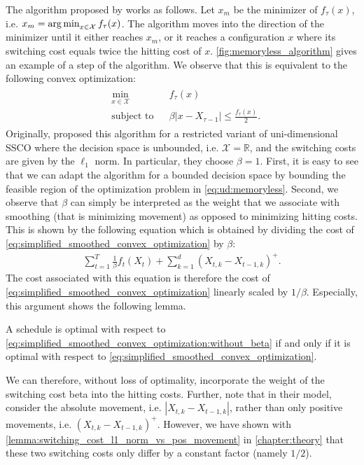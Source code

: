 The algorithm proposed by \citeauthor*{Bansal2015} works as follows. Let $x_m$ be the minimizer of $f_{\tau}(x)$, i.e. $x_m = \operatorname*{arg\,min}_{x \in \mathcal{X}} f_{\tau}(x)$. The algorithm moves into the direction of the minimizer until it either reaches $x_m$, or it reaches a configuration $x$ where its switching cost equals twice the hitting cost of $x$. \autoref{fig:memoryless_algorithm} gives an example of a step of the algorithm. We observe that this is equivalent to the following convex optimization: \begin{align}\label{eq:ud:memoryless}\begin{aligned}
    &\min_{x \in \mathcal{X}} &&f_{\tau}(x) \\
    &\text{subject to}        &&\beta |x - X_{\tau-1}| \leq \frac{f_{\tau}(x)}{2}.
\end{aligned}\end{align} Originally, \citeauthor*{Bansal2015} proposed this algorithm for a restricted variant of uni-dimensional SSCO where the decision space is unbounded, i.e. $\mathcal{X} = \mathbb{R}$, and the switching costs are given by the $\ell_1$ norm. In particular, they choose $\beta = 1$. First, it is easy to see that we can adapt the algorithm for a bounded decision space by bounding the feasible region of the optimization problem in \autoref{eq:ud:memoryless}. Second, we observe that $\beta$ can simply be interpreted as the weight that we associate with smoothing (that is minimizing movement) as opposed to minimizing hitting costs. This is shown by the following equation which is obtained by dividing the cost of \autoref{eq:simplified_smoothed_convex_optimization} by $\beta$: \begin{align}\label{eq:simplified_smoothed_convex_optimization:without_beta}
    \sum_{t=1}^T \frac{1}{\beta} f_t(X_t) + \sum_{k=1}^d (X_{t,k} - X_{t-1,k})^+.
\end{align} The cost associated with this equation is therefore the cost of \autoref{eq:simplified_smoothed_convex_optimization} linearly scaled by $1 / \beta$. Especially, this argument shows the following lemma.

\begin{lemma}\label{lemma:switching_cost_absolute_vs_positive_movement}
A schedule is optimal with respect to \autoref{eq:simplified_smoothed_convex_optimization:without_beta} if and only if it is optimal with respect to \autoref{eq:simplified_smoothed_convex_optimization}.
\end{lemma}

We can therefore, without loss of optimality, incorporate the weight of the switching cost beta into the hitting costs. Further, note that in their model, \citeauthor*{Bansal2015} consider the absolute movement, i.e. $|X_{t,k} - X_{t-1,k}|$, rather than only positive movements, i.e. $(X_{t,k} - X_{t-1,k})^+$. However, we have shown with \autoref{lemma:switching_cost_l1_norm_vs_pos_movement} in \autoref{chapter:theory} that these two switching costs only differ by a constant factor (namely $1/2$).

